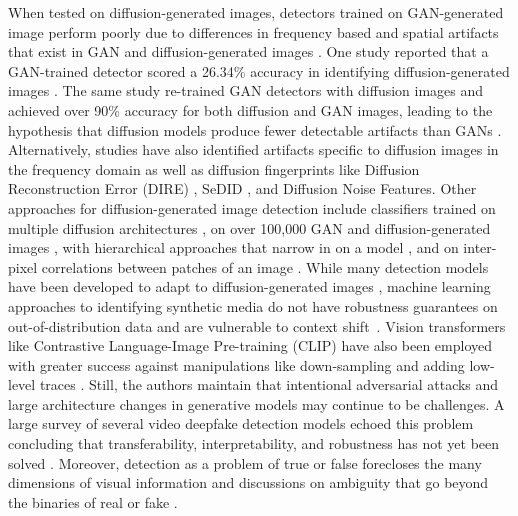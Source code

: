 When tested on diffusion-generated images, detectors trained on GAN-generated image perform poorly due to differences in frequency based and spatial artifacts that exist in GAN and diffusion-generated images \cite{corvi2023intriguingpropertiessyntheticimages}. One study reported that a GAN-trained detector scored a 26.34\% accuracy in identifying diffusion-generated images \cite{ricker2024detectiondiffusionmodeldeepfakes}. The same study re-trained GAN detectors with diffusion images and achieved over 90\% accuracy for both diffusion and GAN images, leading to the hypothesis that diffusion models produce fewer detectable artifacts than GANs \cite{ricker2024detectiondiffusionmodeldeepfakes}. Alternatively, studies have also identified artifacts specific to diffusion images in the frequency domain \cite{xi2023aigeneratedimagedetectionusing, 10334046} as well as diffusion fingerprints like  Diffusion Reconstruction Error (DIRE) \cite{wang2023dirediffusiongeneratedimagedetection}, SeDID \cite{ma2023exposingfakeeffectivediffusiongenerated}, and Diffusion Noise Features\cite{zhang2024diffusionnoisefeatureaccurate}. Other approaches for diffusion-generated image detection include classifiers trained on multiple diffusion architectures \cite{epstein2023onlinedetectionaigeneratedimages}, on over 100,000 GAN and diffusion-generated images \cite{porcile2024findingaigeneratedfaceswild}, with hierarchical approaches that narrow in on a model \cite{10.1145/3652027}, and on inter-pixel correlations between patches of an image \cite{zhong2023rich, zhong2024patchcraftexploringtexturepatch}. While  many detection models have been developed to adapt to diffusion-generated images , machine learning approaches to identifying synthetic media do not have robustness guarantees on out-of-distribution data and are vulnerable to context shift~\cite{groh2022identifying}.  Vision transformers like Contrastive Language-Image
Pre-training (CLIP) \cite{radford2021learning} have also been employed with greater success against manipulations like down-sampling and adding low-level traces \cite{ojha2024universalfakeimagedetectors, cozzolino2024raisingbaraigeneratedimage}. Still, the authors maintain that intentional adversarial attacks \cite{carlini2020evadingdeepfakeimagedetectorswhite} and large architecture changes in generative models may continue to be challenges. A large survey of several video deepfake detection models echoed this problem concluding that transferability, interpretability, and robustness has not yet been solved \cite{wang2023deepfakedetectioncomprehensivestudy}. Moreover, detection as a problem of true or false forecloses the many dimensions of visual information and discussions on ambiguity that go beyond the binaries of real or fake \cite{jacobsen2024deepfakes}.
\fi




